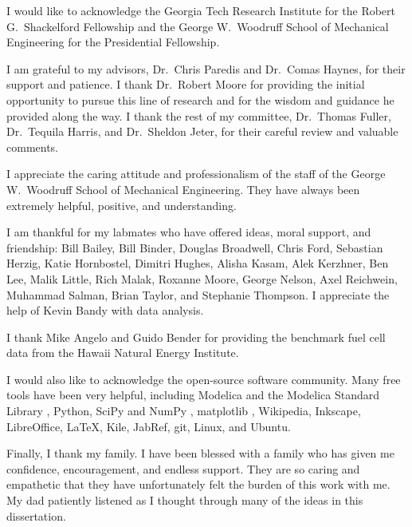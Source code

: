 \begin{acknowledgements} 

I would like to acknowledge the Georgia Tech Research Institute for the Robert G.\ Shackelford Fellowship and the George W.\ Woodruff School of Mechanical Engineering for the Presidential Fellowship.

I am grateful to my advisors, Dr.\ Chris Paredis and Dr.\ Comas Haynes, for their support and patience.  I thank Dr.\ Robert Moore for providing the initial opportunity to pursue this line of research and for the wisdom and guidance he provided along the way.  I thank the rest of my committee, Dr.\ Thomas Fuller, Dr.\ Tequila Harris, and Dr.\ Sheldon Jeter, for their careful review and valuable comments.

I appreciate the caring attitude and professionalism of the staff of the George W.\ Woodruff School of Mechanical Engineering.  They have always been extremely helpful, positive, and understanding.

I am thankful for my labmates who have offered ideas, moral support, and friendship:
Bill Bailey,
Bill Binder,
Douglas Broadwell,
Chris Ford, 
Sebastian Herzig,
Katie Hornbostel,
Dimitri Hughes,
Alisha Kasam, 
Alek Kerzhner, 
Ben Lee, 
Malik Little,
Rich Malak,
Roxanne Moore, 
George Nelson,
Axel Reichwein, 
Muhammad Salman,
Brian Taylor, and
Stephanie Thompson.  
I appreciate the help of Kevin Bandy with data analysis.

I thank Mike Angelo and Guido Bender for providing the benchmark fuel cell data from the Hawaii Natural Energy Institute.  

I would also like to acknowledge the open-source software community.  Many free tools have been very helpful, including 
Modelica \cite{Modelica3.3} and the Modelica Standard Library \cite{ModelicaSL3.2}, 
Python,
SciPy and NumPy \cite{Oliphant2007},
matplotlib \cite{Hunter2007}, 
Wikipedia, 
Inkscape, 
LibreOffice, 
LaTeX,
Kile,
JabRef,
git, 
Linux, and 
Ubuntu.

Finally, I thank my family.  I have been blessed with a family who has given me confidence, encouragement, and endless support.  They are so caring and empathetic that they have unfortunately felt the burden of this work with me.  My dad patiently listened as I thought through many of the ideas in this dissertation.

\end{acknowledgements} 